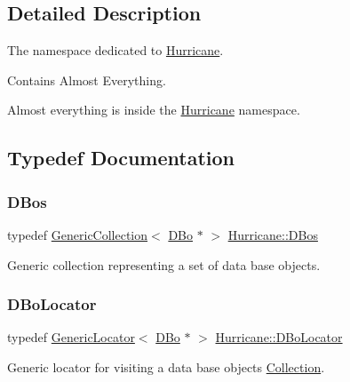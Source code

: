 \subsection{Detailed Description}
The namespace dedicated to \mbox{\hyperlink{namespaceHurricane}{Hurricane}}. 

Contains Almost Everything.

Almost everything is inside the \mbox{\hyperlink{namespaceHurricane}{Hurricane}} namespace. 

\subsection{Typedef Documentation}
\mbox{\label{namespaceHurricane_a0aa3882e095f9d425c253223d1c0793d}} 
\subsubsection{\texorpdfstring{D\+Bos}{DBos}}
{\footnotesize\ttfamily typedef \mbox{\hyperlink{classHurricane_1_1GenericCollection}{Generic\+Collection}}$<$ \mbox{\hyperlink{classHurricane_1_1DBo}{D\+Bo}} $\ast$ $>$ \mbox{\hyperlink{namespaceHurricane_a0aa3882e095f9d425c253223d1c0793d}{Hurricane\+::\+D\+Bos}}}

Generic collection representing a set of data base objects. \mbox{\label{namespaceHurricane_a7d70ef7ad837859e453171feb692535c}} 
\subsubsection{\texorpdfstring{D\+Bo\+Locator}{DBoLocator}}
{\footnotesize\ttfamily typedef \mbox{\hyperlink{classHurricane_1_1GenericLocator}{Generic\+Locator}}$<$ \mbox{\hyperlink{classHurricane_1_1DBo}{D\+Bo}} $\ast$ $>$ \mbox{\hyperlink{namespaceHurricane_a7d70ef7ad837859e453171feb692535c}{Hurricane\+::\+D\+Bo\+Locator}}}

Generic locator for visiting a data base objects \mbox{\hyperlink{classHurricane_1_1Collection}{Collection}}. \mbox{\label{namespaceHurricane_a2af87173f0c45c5dc1f504d3ea2317d9}} 
